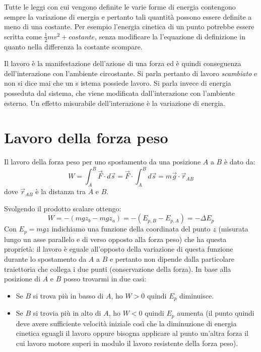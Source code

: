 \documentclass[class=book, crop=false, oneside, 12pt]{standalone}
\begin{document}
Tutte le leggi con cui vengono definite le varie forme di energia contengono sempre la variazione di energia e pertanto tali quantità possono essere definite a meno di una costante. 
Per esempio l'energia cinetica di un punto potrebbe essere scritta come \(\frac{1}{2} m v^2 + costante\), senza modificare la l'equazione di definizione in quanto nella differenza la costante scompare.

Il lavoro è la manifestazione dell'azione di una forza ed è quindi conseguenza dell'interazione con l'ambiente circostante. 
Si parla pertanto di lavoro \emph{scambiato} e non si dice mai che  un s istema possiede lavoro. 
Si parla invece di energia posseduta dal sistema, che viene modificata dall'interazione con l'ambiente esterno. Un effetto misurabile dell'interazione è la variazione di energia. 

\section{Lavoro della forza peso}

Il lavoro della forza peso per uno spostamento da una posizione \(A\) a \(B\) è dato da:
\begin{equation}
    W = \int_A^B \overrightarrow{F} \cdot d \overrightarrow{s} = \overrightarrow{F} \cdot \int_A^B d \overrightarrow{s} = m \overrightarrow{g} \cdot \overrightarrow{r}_{AB}
\end{equation}
dove \(\overrightarrow{r}_{AB}\) è la distanza tra \(A\) e \(B\).

Svolgendo il prodotto scalare ottengo:
\begin{equation}
    W = - (mgz_b - mgz_a) =- (E_{p,B} - E_{p,A}) = - \Delta E_p
\end{equation}
Con \(E_p= m g z\) indichiamo una funzione della coordinata del punto \(z\) (misurata lungo un asse parallelo e di verso opposto alla forza peso) che ha questa proprietà: il lavoro è eguale all'opposto della variazione di questa funzione durante lo spostamento da \(A\) a \(B\) e pertanto non dipende dalla particolare traiettoria che collega i due punti (conservazione della forza).\newline
In base alla posizione di \(A\) e \(B\) posso trovarmi in due casi:
\begin{itemize}
    \item Se \(B\) si trova più in basso di \(A\), ho \(W>0\) quindi \(E_p\) diminuisce.
    \item Se \(B\) si trovia più in alto di \(A\), ho \(W<0\) quindi \(E_p\) aumenta 
    (il punto quindi deve avere sufficiente velocità iniziale così che la diminuzione di energia cinetica eguagli il lavoro oppure bisogna applicare al punto un'altra forza il cui lavoro motore superi in modulo il lavoro resistente della forza peso).
\end{itemize}
\end{document}
